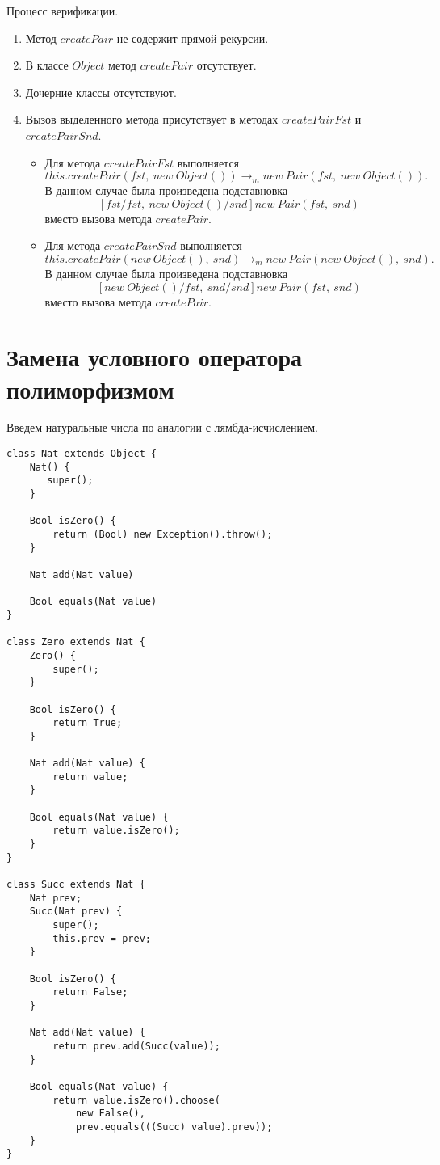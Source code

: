 Процесс верификации.
\begin{enumerate}
    \item Метод $createPair$ не содержит прямой рекурсии.
    \item В классе $Object$ метод $createPair$ отсутствует.
    \item Дочерние классы отсутствуют.
    \item Вызов выделенного метода присутствует в методах $createPairFst$ и $createPairSnd$.
    \begin{itemize}
        \item Для метода $createPairFst$ выполняется
        $$this.createPair(fst,\ new\ Object()) \rightarrow_m new\ Pair(fst,\ new\ Object()).$$
        В данном случае была произведена подставновка
        $$[fst/fst,\ new\ Object()/snd]new\ Pair(fst,\ snd)$$
        вместо вызова метода $createPair$.
        \item Для метода $createPairSnd$ выполняется
        $$this.createPair(new\ Object(),\ snd) \rightarrow_m new\ Pair(new\ Object(),\ snd).$$
        В данном случае была произведена подставновка
        $$[new\ Object()/fst,\ snd/snd]new\ Pair(fst,\ snd)$$
        вместо вызова метода $createPair$.
    \end{itemize}
\end{enumerate}

\section{Замена условного оператора полиморфизмом}
Введем натуральные числа по аналогии с лямбда-исчислением.
\begin{lstlisting}[float,label=nat,caption=Определение натуральных чисел]
class Nat extends Object {
    Nat() {
       super();
    }

    Bool isZero() {
        return (Bool) new Exception().throw();
    }

    Nat add(Nat value)

    Bool equals(Nat value)
}

class Zero extends Nat {
    Zero() {
        super();
    }

    Bool isZero() {
        return True;
    }

    Nat add(Nat value) {
        return value;
    }

    Bool equals(Nat value) {
        return value.isZero();
    }
}

class Succ extends Nat {
    Nat prev;
    Succ(Nat prev) {
        super();
        this.prev = prev;
    }

    Bool isZero() {
        return False;
    }

    Nat add(Nat value) {
        return prev.add(Succ(value));
    }

    Bool equals(Nat value) {
        return value.isZero().choose(
            new False(),
            prev.equals(((Succ) value).prev));
    }
}
\end{lstlisting}

